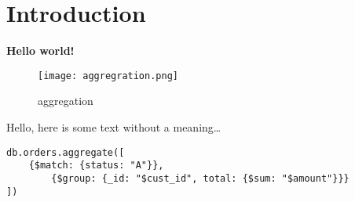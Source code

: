 \documentclass[../main.tex]{subfiles}
\begin{document}
\section{Introduction}
\textbf{Hello world!}

\begin{figure}[bh]
	\centering
	\texttt{[image: aggregration.png]}
	\label{fig:aggregration}
	\caption{aggregation}
\end{figure}
Hello, here is some text without a meaning\ldots

\begin{lstlisting}[caption=test,language=MongoDB]
db.orders.aggregate([
	{$match: {status: "A"}}, 
		{$group: {_id: "$cust_id", total: {$sum: "$amount"}}}
])
\end{lstlisting}
\end{document}
